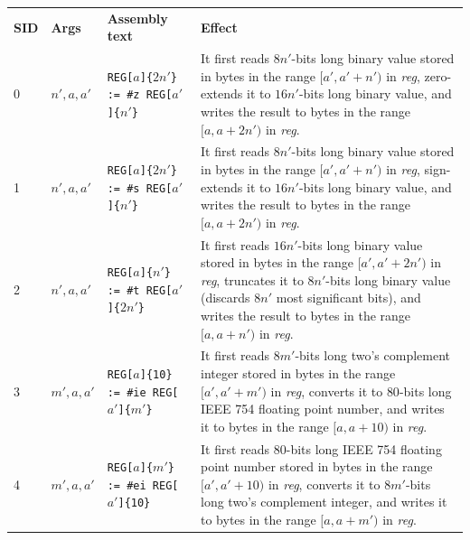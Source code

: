 \documentclass[10pt,twocolumn]{article}
\begin{document}
\clearpage




\begin{table}[!h]
\begin{center}
\def\arraystretch{1.5}
\begin{tabular}{lp{1.2cm}p{5.5cm}p{7.5cm}}
\textbf{SID} & \textbf{Args} & \textbf{Assembly text} & \textbf{Effect}
\\

0 & $ n',a,a' $ %
& \texttt{REG[}$ a $\texttt{]\{}$ 2n' $\texttt{\} := \#z REG[}$ a'
$\texttt{]\{}$ n' $\texttt{\}} %
& It first reads $ 8n' $-bits long binary value stored in bytes in the range $
[a',a'+n') $ in \textit{reg}, zero-extends it to $ 16n' $-bits long binary value,
and writes the result to bytes in the range $ [a,a+2n') $ in \textit{reg}.
\\

1 & $ n',a,a' $ %
& \texttt{REG[}$ a $\texttt{]\{}$ 2n' $\texttt{\} := \#s REG[}$ a'
$\texttt{]\{}$ n' $\texttt{\}} %
& It first reads $ 8n' $-bits long binary value stored in bytes in the range $
[a',a'+n') $ in \textit{reg}, sign-extends it to $ 16n' $-bits long binary value,
and writes the result to bytes in the range $ [a,a+2n') $ in \textit{reg}.
\\

2 & $ n',a,a' $ %
& \texttt{REG[}$ a $\texttt{]\{}$ n' $\texttt{\} := \#t REG[}$ a'
$\texttt{]\{}$ 2n' $\texttt{\}} %
& It first reads $ 16n' $-bits long binary value stored in bytes in the range $
[a',a'+2n') $ in \textit{reg}, truncates it to $ 8n' $-bits long binary value
(discards $ 8n' $ most significant bits), and writes the result to bytes in the
range $ [a,a+n') $ in \textit{reg}.
\\

3 & $ m',a,a' $ %
& \texttt{REG[}$ a $\texttt{]\{10\} := \#ie REG[}$ a' $\texttt{]\{}$ m'
$\texttt{\}} %
& It first reads $ 8m' $-bits long two's complement integer stored in bytes in
the range $ [a',a'+m') $ in \textit{reg}, converts it to $ 80 $-bits long IEEE
754 floating point number, and writes it to bytes in the range $ [a,a+10) $ in
\textit{reg}.
\\

4 & $ m',a,a' $ %
& \texttt{REG[}$ a $\texttt{]\{}$ m' $\texttt{\} := \#ei REG[}$ a'
$\texttt{]\{10\}} %
& It first reads $ 80 $-bits long IEEE 754 floating point number stored in bytes in
the range $ [a',a'+10) $ in \textit{reg}, converts it to $ 8m' $-bits long two's
complement integer, and writes it to bytes in the range $ [a,a+m') $ in
\textit{reg}.
\\


\end{tabular}
\end{center}
\end{table}
\end{document}
